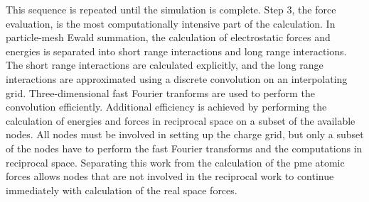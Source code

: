 This sequence is repeated until the simulation is complete.  Step 3, the force
evaluation, is the most computationally intensive part of the calculation.      
In particle-mesh Ewald summation, the calculation of electrostatic forces and
energies is separated into short range interactions and
long range interactions.  The short range interactions are calculated explicitly,
and the long range interactions are approximated using a discrete convolution
on an interpolating grid.  Three-dimensional fast Fourier tranforms are used
to perform the convolution efficiently.  Additional efficiency is achieved by
performing the calculation of energies and forces in reciprocal space on a subset
of the available nodes.  All nodes must be involved in setting up the charge grid,
but only a subset of the nodes have to perform the fast Fourier 
transforms and the computations
in reciprocal space.  Separating this work from the calculation of the pme atomic 
forces allows nodes that are not involved in the reciprocal work to continue
immediately with calculation of the real space forces.



